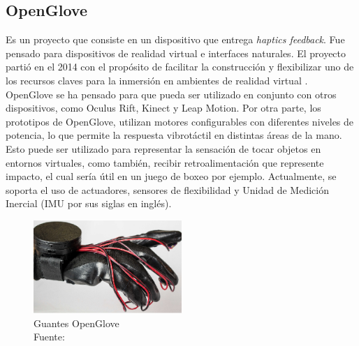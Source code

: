 \subsection{OpenGlove}
	Es un proyecto que consiste en un dispositivo que entrega \textit{haptics feedback}. Fue pensado para dispositivos de realidad virtual e interfaces naturales. El proyecto partió en el 2014 con el propósito  de facilitar la construcción y flexibilizar uno de los recursos claves para la inmersión en ambientes de  realidad virtual \citep{openglove-info-page}. OpenGlove se ha pensado para que pueda ser utilizado en conjunto con otros dispositivos, como Oculus Rift, Kinect y Leap Motion. Por otra parte, los prototipos de OpenGlove, utilizan motores configurables con diferentes niveles de potencia, lo que permite la respuesta vibrotáctil en distintas áreas de la mano. Esto puede ser utilizado para representar la sensación de tocar objetos en entornos virtuales, como también, recibir retroalimentación que represente impacto, el cual sería útil en un juego de boxeo por ejemplo.   Actualmente, se soporta el uso de actuadores, sensores de flexibilidad y Unidad de Medición Inercial (IMU por sus siglas en inglés).
    
            
\begin{figure}[H]
  \begin{center} 
   	\includegraphics[width=0.5\textwidth]{images/chapter02/openglove.png} 
    \caption[Guantes OpenGlove]{Guantes OpenGlove \\Fuente: \cite{openglove-info-page}} 
    \label{fig:OpenGlove}
  \end{center}
\end{figure}

    


